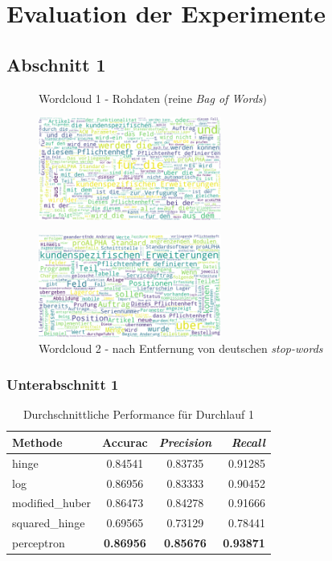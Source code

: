 \chapter{Evaluation der Experimente}
\label{ch:versuche}


\section{Abschnitt 1}
\label{sec:domain-stopwords}

\begin{figure}[htbp]	
	\begin{minipage}{0.48\textwidth}
		\centering
		\caption{Wordcloud 1 - Rohdaten (reine \textit{Bag of Words})}
		\label{pic:wc-raw}
		\includegraphics[width=6cm]{img/roh.png}
	\end{minipage}
	\hfill
	\begin{minipage}{0.48\textwidth}
		\centering
		\caption{Wordcloud 2 - nach Entfernung von deutschen \textit{stop-words}}
		\label{pic:wc-stops1}
		\includegraphics[width=6cm]{img/nurstop.png}		
	\end{minipage} 	
\end{figure}

\subsection{Unterabschnitt 1}

\begin{table}[htb]
	\centering
	\begin{tabular}{lccr} \hline
		Methode & Accurac & \textit{Precision} & \textit{Recall} \\ \hline
		hinge & 0.84541 & 0.83735 & 0.91285 \\
		log & 0.86956 & 0.83333 & 0.90452 \\
		modified\_huber & 0.86473 & 0.84278 & 0.91666 \\
		squared\_hinge & 0.69565 & 0.73129 & 0.78441 \\
		perceptron & \textbf{0.86956} & \textbf{0.85676} & \textbf{0.93871} \\ \hline
	\end{tabular}
	\caption{Durchschnittliche Performance für Durchlauf 1}
	\label{tab:methods-d1}
\end{table}

